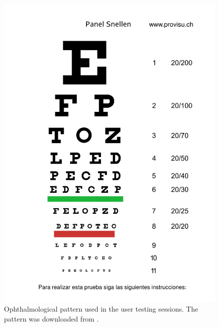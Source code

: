 \documentclass[10pt,a4paper,twocolumn,twoside]{article}
\begin{document}
	\begin{figure}
		\centering
		\includegraphics[width=1\linewidth]{img/Snellenchart_es-1.png}
		\caption{Ophthalmological pattern used in the user testing sessions. The pattern was downloaded from \cite{web:snellen}.}
		\label{fig:add:pattern}
	\end{figure}
	
	
\end{document}
